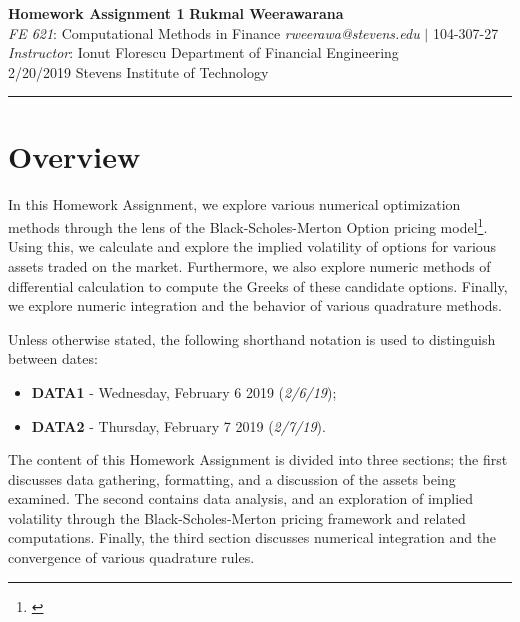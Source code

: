 \documentclass[10pt]{article}
\begin{document}
\thispagestyle{plain}



\noindent
\large\textbf{Homework Assignment 1} \hfill \textbf{Rukmal Weerawarana} \\
\normalsize \textit{FE 621}: Computational Methods in Finance \hfill \textit{rweerawa@stevens.edu} $\mid$ 104-307-27 \\
\textit{Instructor}: Ionut Florescu \hfill Department of Financial Engineering \\
2/20/2019 \hfill Stevens Institute of Technology

\noindent\rule{\linewidth}{.1em}



\section*{Overview}

In this Homework Assignment, we explore various numerical optimization methods through the lens of the Black-Scholes-Merton Option pricing model\footnote{\cite{Shreve2004}}. Using this, we calculate and explore the implied volatility of options for various assets traded on the market. Furthermore, we also explore numeric methods of differential calculation to compute the Greeks of these candidate options. Finally, we explore numeric integration and the behavior of various quadrature methods.

Unless otherwise stated, the following shorthand notation is used to distinguish between dates:

\begin{itemize}
    \item \textbf{DATA1} - Wednesday, February 6 2019 (\textit{2/6/19});
    \item \textbf{DATA2} - Thursday, February 7 2019 (\textit{2/7/19}).
\end{itemize}

The content of this Homework Assignment is divided into three sections; the first discusses data gathering, formatting, and a discussion of the assets being examined. The second contains data analysis, and an exploration of implied volatility through the Black-Scholes-Merton pricing framework and related computations. Finally, the third section discusses numerical integration and the convergence of various quadrature rules.
\end{document}
